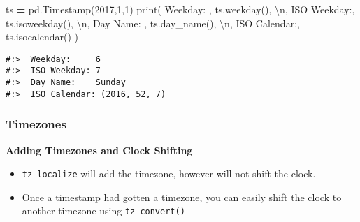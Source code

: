 \documentclass[
]{book}
\newenvironment{Shaded}{\begin{snugshade}}{\end{snugshade}}
\newcommand{\BuiltInTok}[1]{#1}
\newcommand{\CharTok}[1]{\textcolor[rgb]{0.5,0.5,0.5}{#1}}
\newcommand{\DecValTok}[1]{\textcolor[rgb]{0.06,0.06,0.06}{#1}}
\newcommand{\NormalTok}[1]{#1}
\newcommand{\OperatorTok}[1]{\textcolor[rgb]{0.43,0.43,0.43}{\textbf{#1}}}
\newcommand{\StringTok}[1]{\textcolor[rgb]{0.5,0.5,0.5}{#1}}
\providecommand{\tightlist}{%
  \setlength{\itemsep}{0pt}\setlength{\parskip}{0pt}}
\begin{document}
\begin{Shaded}
\begin{Highlighting}[]
\NormalTok{ts }\OperatorTok{=}\NormalTok{ pd.Timestamp(}\DecValTok{2017}\NormalTok{,}\DecValTok{1}\NormalTok{,}\DecValTok{1}\NormalTok{)}
\BuiltInTok{print}\NormalTok{( }\StringTok{\textquotesingle{} Weekday:    \textquotesingle{}}\NormalTok{, ts.weekday(), }\StringTok{\textquotesingle{}}\CharTok{\textbackslash{}n}\StringTok{\textquotesingle{}}\NormalTok{,}
       \StringTok{\textquotesingle{}ISO Weekday:\textquotesingle{}}\NormalTok{,  ts.isoweekday(), }\StringTok{\textquotesingle{}}\CharTok{\textbackslash{}n}\StringTok{\textquotesingle{}}\NormalTok{,}
       \StringTok{\textquotesingle{}Day Name:   \textquotesingle{}}\NormalTok{,  ts.day\_name(), }\StringTok{\textquotesingle{}}\CharTok{\textbackslash{}n}\StringTok{\textquotesingle{}}\NormalTok{,}
       \StringTok{\textquotesingle{}ISO Calendar:\textquotesingle{}}\NormalTok{,  ts.isocalendar()}
\NormalTok{       )}
\end{Highlighting}
\end{Shaded}

\begin{verbatim}
#:>  Weekday:     6 
#:>  ISO Weekday: 7 
#:>  Day Name:    Sunday 
#:>  ISO Calendar: (2016, 52, 7)
\end{verbatim}

\hypertarget{timezones}{%
\subsubsection{Timezones}\label{timezones}}

\textbf{Adding Timezones and Clock Shifting}

\begin{itemize}
\tightlist
\item
  \texttt{tz\_localize} will add the timezone, however will not shift the clock.\\
\item
  Once a timestamp had gotten a timezone, you can easily shift the clock to another timezone using \texttt{tz\_convert()}
\end{itemize}
\end{document}

